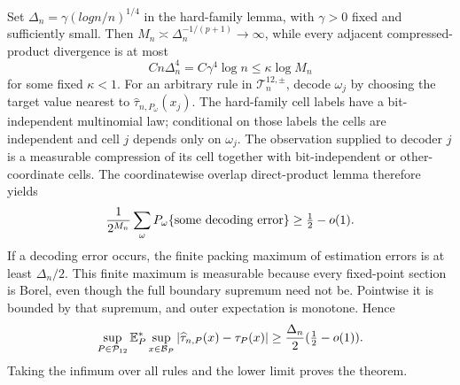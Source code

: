 Set \(\Delta_n=\gamma(log n/n)^{1/4}\) in the hard-family lemma, with \(\gamma>0\) fixed and sufficiently small.  Then \(M_n\asymp\Delta_n^{-1/(p+1)}\to\infty\), while every adjacent compressed-product divergence is at most
\[
 Cn\Delta_n^4=C\gamma^4\log n\leq\kappa\log M_n
\]
for some fixed \(\kappa<1\).  For an arbitrary rule in \(\mathcal T^{12,\pm}_n\), decode \(\omega_j\) by choosing the target value nearest to \(\widehat\tau_{n,P_\omega}(x_j)\).  The hard-family cell labels have a bit-independent multinomial law; conditional on those labels the cells are independent and cell \(j\) depends only on \(\omega_j\).  The observation supplied to decoder \(j\) is a measurable compression of its cell together with bit-independent or other-coordinate cells.  The coordinatewise overlap direct-product lemma therefore yields
\[
 {1\over2^{M_n}}\sum_\omega P_\omega\{\text{some decoding error}\}
 \geq\tfrac12-o(1).
\]
If a decoding error occurs, the finite packing maximum of estimation errors is at least \(\Delta_n/2\).  This finite maximum is measurable because every fixed-point section is Borel, even though the full boundary supremum need not be.  Pointwise it is bounded by that supremum, and outer expectation is monotone.  Hence
\[
 \sup_{P\in\mathcal P_{12}}\mathbb E_P^*\sup_{x\in\mathcal B_P}|\widehat\tau_{n,P}(x)-\tau_P(x)|
 \geq {\Delta_n\over2}(\tfrac12-o(1)).
\]
Taking the infimum over all rules and the lower limit proves the theorem.